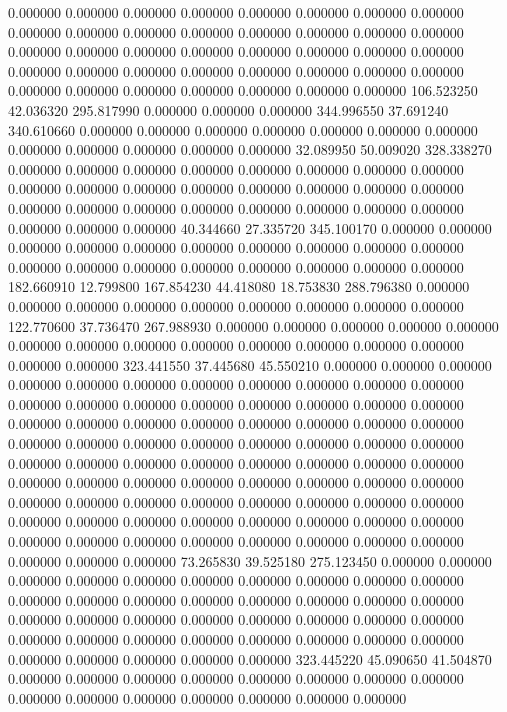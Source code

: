 0.000000 0.000000 0.000000
0.000000 0.000000 0.000000
0.000000 0.000000 0.000000
0.000000 0.000000 0.000000
0.000000 0.000000 0.000000
0.000000 0.000000 0.000000
0.000000 0.000000 0.000000
0.000000 0.000000 0.000000
0.000000 0.000000 0.000000
0.000000 0.000000 0.000000
0.000000 0.000000 0.000000
0.000000 0.000000 0.000000
0.000000 0.000000 0.000000
106.523250 42.036320 295.817990
0.000000 0.000000 0.000000
344.996550 37.691240 340.610660
0.000000 0.000000 0.000000
0.000000 0.000000 0.000000
0.000000 0.000000 0.000000
0.000000 0.000000 0.000000
32.089950 50.009020 328.338270
0.000000 0.000000 0.000000
0.000000 0.000000 0.000000
0.000000 0.000000 0.000000
0.000000 0.000000 0.000000
0.000000 0.000000 0.000000
0.000000 0.000000 0.000000
0.000000 0.000000 0.000000
0.000000 0.000000 0.000000
0.000000 0.000000 0.000000
40.344660 27.335720 345.100170
0.000000 0.000000 0.000000
0.000000 0.000000 0.000000
0.000000 0.000000 0.000000
0.000000 0.000000 0.000000
0.000000 0.000000 0.000000
0.000000 0.000000 0.000000
182.660910 12.799800 167.854230
44.418080 18.753830 288.796380
0.000000 0.000000 0.000000
0.000000 0.000000 0.000000
0.000000 0.000000 0.000000
122.770600 37.736470 267.988930
0.000000 0.000000 0.000000
0.000000 0.000000 0.000000
0.000000 0.000000 0.000000
0.000000 0.000000 0.000000
0.000000 0.000000 0.000000
323.441550 37.445680 45.550210
0.000000 0.000000 0.000000
0.000000 0.000000 0.000000
0.000000 0.000000 0.000000
0.000000 0.000000 0.000000
0.000000 0.000000 0.000000
0.000000 0.000000 0.000000
0.000000 0.000000 0.000000
0.000000 0.000000 0.000000
0.000000 0.000000 0.000000
0.000000 0.000000 0.000000
0.000000 0.000000 0.000000
0.000000 0.000000 0.000000
0.000000 0.000000 0.000000
0.000000 0.000000 0.000000
0.000000 0.000000 0.000000
0.000000 0.000000 0.000000
0.000000 0.000000 0.000000
0.000000 0.000000 0.000000
0.000000 0.000000 0.000000
0.000000 0.000000 0.000000
0.000000 0.000000 0.000000
0.000000 0.000000 0.000000
0.000000 0.000000 0.000000
0.000000 0.000000 0.000000
0.000000 0.000000 0.000000
0.000000 0.000000 0.000000
73.265830 39.525180 275.123450
0.000000 0.000000 0.000000
0.000000 0.000000 0.000000
0.000000 0.000000 0.000000
0.000000 0.000000 0.000000
0.000000 0.000000 0.000000
0.000000 0.000000 0.000000
0.000000 0.000000 0.000000
0.000000 0.000000 0.000000
0.000000 0.000000 0.000000
0.000000 0.000000 0.000000
0.000000 0.000000 0.000000
0.000000 0.000000 0.000000
0.000000 0.000000 0.000000
323.445220 45.090650 41.504870
0.000000 0.000000 0.000000
0.000000 0.000000 0.000000
0.000000 0.000000 0.000000
0.000000 0.000000 0.000000
0.000000 0.000000 0.000000
